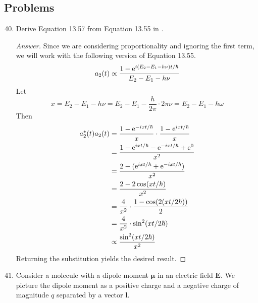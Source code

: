 \documentclass[../notes.tex]{subfiles}
\begin{document}
\subsection*{Problems}
\begin{enumerate}[label={\textbf{13-\arabic*.}},ref={13-\arabic*}]
    \setcounter{enumi}{39}
    \item \label{prb:13-40}Derive Equation 13.57 from Equation 13.55 in \textcite{bib:McQuarrieSimon}.
    \begin{proof}[Answer]
        Since we are considering proportionality and ignoring the first term, we will work with the following version of Equation 13.55.
        \begin{equation*}
            a_2(t) \propto \frac{1-\e[i(E_2-E_1-h\nu)t/\hbar]}{E_2-E_1-h\nu}
        \end{equation*}
        Let
        \begin{equation*}
            x = E_2-E_1-h\nu
            = E_2-E_1-\frac{h}{2\pi}\cdot 2\pi\nu
            = E_2-E_1-\hbar\omega
        \end{equation*}
        Then
        \begin{align*}
            a_2^*(t)a_2(t) &= \frac{1-\e[-ixt/\hbar]}{x}\cdot\frac{1-\e[ixt/\hbar]}{x}\\
            &= \frac{1-\e[ixt/\hbar]-\e[-ixt/\hbar]+\e[0]}{x^2}\\
            &= \frac{2-(\e[ixt/\hbar]+\e[-ixt/\hbar])}{x^2}\\
            &= \frac{2-2\cos(xt/\hbar)}{x^2}\\
            &= \frac{4}{x^2}\cdot\frac{1-\cos(2(xt/2\hbar))}{2}\\
            &= \frac{4}{x^2}\cdot\sin^2(xt/2\hbar)\\
            &\propto \frac{\sin^2(xt/2\hbar)}{x^2}
        \end{align*}
        Returning the substitution yields the desired result.
    \end{proof}
    \setcounter{enumi}{48}
    \item \label{prb:13-49}Consider a molecule with a dipole moment $\bm{\mu}$ in an electric field $\bm{E}$. We picture the dipole moment as a positive charge and a negative charge of magnitude $q$ separated by a vector $\mathbf{l}$.
    \begin{center}
\end{center}
\end{enumerate}
\end{document}
